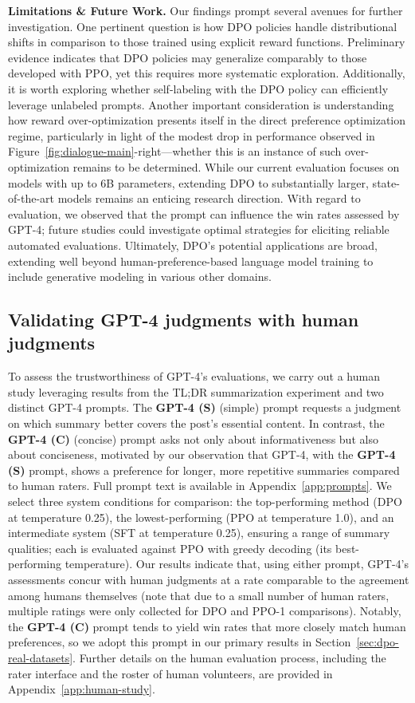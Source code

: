 \textbf{Limitations \& Future Work.} Our findings prompt several avenues for further investigation. One pertinent question is how DPO policies handle distributional shifts in comparison to those trained using explicit reward functions. Preliminary evidence indicates that DPO policies may generalize comparably to those developed with PPO, yet this requires more systematic exploration. Additionally, it is worth exploring whether self-labeling with the DPO policy can efficiently leverage unlabeled prompts. Another important consideration is understanding how reward over-optimization presents itself in the direct preference optimization regime, particularly in light of the modest drop in performance observed in Figure~\ref{fig:dialogue-main}-right—whether this is an instance of such over-optimization remains to be determined. While our current evaluation focuses on models with up to 6B parameters, extending DPO to substantially larger, state-of-the-art models remains an enticing research direction. With regard to evaluation, we observed that the prompt can influence the win rates assessed by GPT-4; future studies could investigate optimal strategies for eliciting reliable automated evaluations. Ultimately, DPO’s potential applications are broad, extending well beyond human-preference-based language model training to include generative modeling in various other domains.

\subsection{Validating GPT-4 judgments with human judgments}
\label{sec:human-judgments}
To assess the trustworthiness of GPT-4's evaluations, we carry out a human study leveraging results from the TL;DR summarization experiment and two distinct GPT-4 prompts. The \textbf{GPT-4 (S)} (simple) prompt requests a judgment on which summary better covers the post's essential content. In contrast, the \textbf{GPT-4 (C)} (concise) prompt asks not only about informativeness but also about conciseness, motivated by our observation that GPT-4, with the \textbf{GPT-4 (S)} prompt, shows a preference for longer, more repetitive summaries compared to human raters. Full prompt text is available in Appendix~\ref{app:prompts}. We select three system conditions for comparison: the top-performing method (DPO at temperature 0.25), the lowest-performing (PPO at temperature 1.0), and an intermediate system (SFT at temperature 0.25), ensuring a range of summary qualities; each is evaluated against PPO with greedy decoding (its best-performing temperature). Our results indicate that, using either prompt, GPT-4's assessments concur with human judgments at a rate comparable to the agreement among humans themselves (note that due to a small number of human raters, multiple ratings were only collected for DPO and PPO-1 comparisons). Notably, the \textbf{GPT-4 (C)} prompt tends to yield win rates that more closely match human preferences, so we adopt this prompt in our primary results in Section~\ref{sec:dpo-real-datasets}. Further details on the human evaluation process, including the rater interface and the roster of human volunteers, are provided in Appendix~\ref{app:human-study}.

